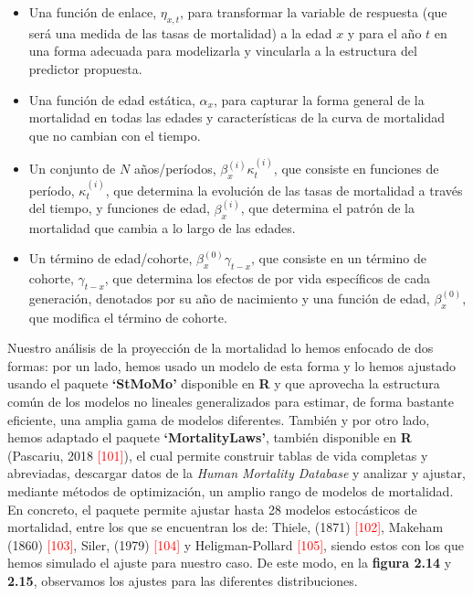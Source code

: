 \begin{itemize}[label={\Large\textbullet}]
\item Una función de enlace, $\eta_{x,t}$, para transformar la variable de respuesta (que será una medida de las tasas de mortalidad) a la edad $x$ y para el año $t$ en una forma adecuada para modelizarla y vincularla a la estructura del predictor propuesta.
\item Una función de edad estática, $\alpha_{x}$, para capturar la forma general de la mortalidad en todas las edades y características de la curva de mortalidad que no cambian con el tiempo.
\item Un conjunto de $N$ años/períodos, $\beta_{x}^{(i)}\kappa_{t}^{(i)}$, que consiste en funciones de período, $\kappa_{t}^{(i)}$, que determina la evolución de las tasas de mortalidad a través del tiempo, y funciones de edad, $\beta_{x}^{(i)}$, que determina el patrón de la mortalidad que cambia a lo largo de las edades.
\item Un término de edad/cohorte, $\beta_{x}^{(0)}\gamma_{t-x}$, que consiste en un término de cohorte, $\gamma_{t-x}$, que determina los efectos de por vida específicos de cada generación, denotados por su año de nacimiento y una función de edad,  $\beta_{x}^{(0)}$, que modifica el término de cohorte.
\end{itemize}  

Nuestro análisis de la proyección de la mortalidad lo hemos enfocado de dos formas: por un lado, hemos usado un modelo de esta forma y lo hemos ajustado usando el paquete \textbf{`StMoMo'} disponible en \textsf{\textbf{R}} y que aprovecha la estructura común de los modelos no lineales generalizados para estimar, de forma bastante eficiente, una amplia gama de modelos diferentes. También y por otro lado, hemos adaptado el paquete \textbf{`MortalityLaws'}, también disponible en \textsf{\textbf{R}} (Pascariu, 2018 \textcolor{red}{[101]}), el cual permite construir tablas de vida completas y abreviadas, descargar datos de la \textit{Human Mortality Database} y analizar y ajustar, mediante métodos de optimización, un amplio rango de modelos de mortalidad. En concreto, el paquete permite ajustar hasta 28 modelos estocásticos de mortalidad, entre los que se encuentran los de: Thiele, (1871) \textcolor{red}{[102]}, Makeham (1860) \textcolor{red}{[103]}, Siler, (1979) \textcolor{red}{[104]} y Heligman-Pollard \textcolor{red}{[105]}, siendo estos con los que hemos simulado el ajuste para nuestro caso. De este modo, en la \textbf{figura 2.14} y \textbf{2.15}, observamos los ajustes para las diferentes distribuciones.

